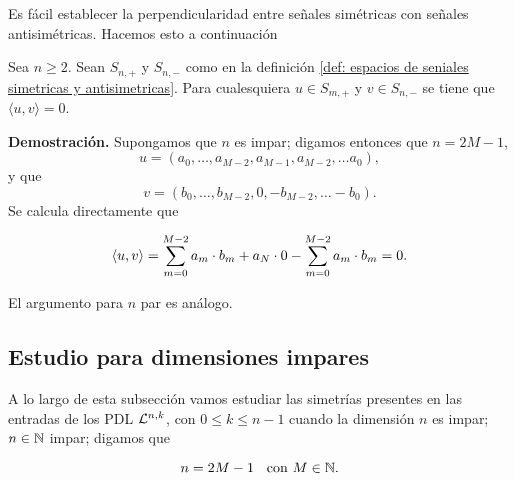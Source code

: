 Es fácil establecer la perpendicularidad entre
señales simétricas con señales antisimétricas.
Hacemos esto a continuación

\begin{lema}
\label{lema: ortogonalidad entre sim y antisim}
Sea $n \geq 2$.
Sean $S_{n,+}$ y $S_{n,-}$ como en la definición
\ref{def: espacios de seniales simetricas y antisimetricas}.
Para cualesquiera 
$u \in S_{m,+}$ y $v \in S_{n,-}$ se tiene que
$\langle u, v \rangle=0$.
\end{lema}
\noindent
\textbf{Demostración.}
Supongamos que $n$ es impar; digamos entonces que
$n = 2M-1$, 
\begin{equation*}
u=(a_{0}, \ldots , a_{M-2}, a_{M-1}, a_{M-2}, \ldots a_{0}),
\end{equation*}
y que 
\begin{equation*}
v=(b_{0}, \ldots , b_{M-2}, 0, -b_{M-2}, \ldots -b_{0}).
\end{equation*}
Se calcula directamente que 

\[
\langle u, v \rangle = \sum\limits_{m=0}^{M-2}a_{m} \cdot b_{m} + a_{N} \cdot 0
-\sum\limits_{m=0}^{M-2}a_{m} \cdot b_{m} =0.
\]

\noindent
El argumento para $n$ par es análogo.
\QEDB
\vspace{0.2cm}

\subsection{Estudio para dimensiones impares}
A lo largo de esta subsección vamos 
estudiar las simetrías presentes en las entradas
de los PDL $\mathcal{L}^{n,k}$, con $0 \leq k \leq n-1$
cuando la dimensión $n$ es impar;
$n \in \mathbb{N}$ impar; digamos que

\begin{equation}
\label{eq1: 19En}
n=2M - 1 \hspace{0.2cm} \text{ con } M \in \mathbb{N}.
\end{equation}

